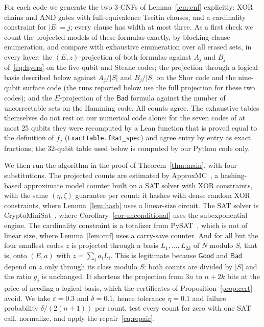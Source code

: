 \documentclass[11pt]{article}
\theoremstyle{remark}
\newcommand{\Good}{\mathsf{Good}}
\newcommand{\Bad}{\mathsf{Bad}}
\newcommand{\eps}{\varepsilon}
\newcommand{\lean}[1]{\texttt{#1}}
\begin{document}
For each code we generate the two 3-CNFs of Lemma~\ref{lem:cnf}
explicitly: XOR chains and AND gates with full-equivalence Tseitin
clauses, and a cardinality constraint for \(|E|=j\); every clause has
width at most three. As a first check we count the projected models of
these formulas exactly, by blocking-clause enumeration, and compare with
exhaustive enumeration over all erased sets, in every layer: the
\((E,z)\)-projection of both formulas against \(A_j\) and \(B_j\)
of~\eqref{eq:layers} on the five-qubit and Steane codes; the projection
through a logical basis described below against \(A_j/|S|\) and
\(B_j/|S|\) on the Shor code and the nine-qubit surface code (the runs
reported below use the full projection for these two codes); and the
\(E\)-projection of the \(\Bad\) formula against the number of
uncorrectable sets on the Hamming code. All counts agree. The exhaustive
tables themselves do not rest on our numerical code alone: for the seven
codes of at most 25 qubits they were recomputed by a Lean function that
is proved equal to the definition of \(f_j\) (\lean{ExactTable.fRat\_spec})
and agree entry by entry as exact fractions; the 32-qubit table used
below is computed by our Python code only.

We then run the algorithm in the proof of Theorem~\ref{thm:main}, with
four substitutions. The projected counts are estimated by
ApproxMC~\cite{cmv2013,cmv2016,soosmeel2019}, a hashing-based approximate
model counter built on a SAT solver with XOR constraints, with the same
\((\eta,\zeta)\) guarantee per count; it hashes with dense random XOR
constraints, where Lemma~\ref{lem:hash} uses a linear-size circuit. The
SAT solver is CryptoMiniSat~\cite{soos2009cms}, where
Corollary~\ref{cor:unconditional} uses the subexponential engine. The
cardinality constraint is a totalizer from PySAT~\cite{pysat2018}, which
is not of linear size, where Lemma~\ref{lem:cnf} uses a carry-save
counter. And for all but the four smallest codes \(z\) is projected
through a basis \(L_1,\ldots,L_{2k}\) of \(N\) modulo \(S\), that is,
onto \((E,a)\) with \(z=\sum_ia_iL_i\). This is legitimate because
\(\Good\) and \(\Bad\) depend on \(z\) only through its class modulo
\(S\): both counts are divided by \(|S|\) and the ratio \(g_j\) is
unchanged. It shortens the projection from \(3n\) to \(n+2k\) bits at the
price of needing a logical basis, which the certificates of
Proposition~\ref{prop:cert} avoid. We take \(\eps=0.3\) and
\(\delta=0.1\), hence tolerance \(\eta=0.1\) and failure probability
\(\delta/(2(n+1))\) per count, test every count for zero with one SAT
call, normalize, and apply the repair~\eqref{eq:repair}.
\end{document}
